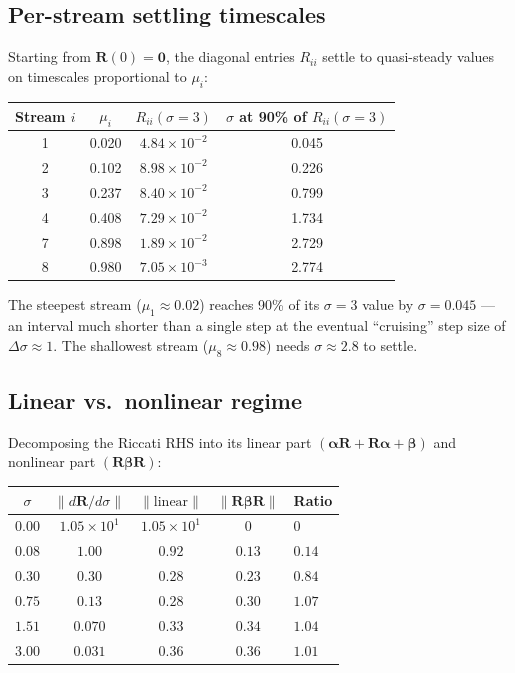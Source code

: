 \documentclass[11pt]{article}
\newcommand{\bR}{\mathbf{R}}
\newcommand{\balpha}{\boldsymbol{\alpha}}
\newcommand{\bbeta}{\boldsymbol{\beta}}
\newcommand{\norm}[1]{\lVert #1 \rVert}
\begin{document}
\subsection{Per-stream settling timescales}

Starting from $\bR(0)=\mathbf{0}$, the diagonal entries $R_{ii}$
settle to quasi-steady values on timescales proportional to $\mu_i$:

\begin{center}
\begin{tabular}{cccc}
\toprule
Stream $i$ & $\mu_i$ & $R_{ii}(\sigma=3)$ & $\sigma$ at 90\% of $R_{ii}(\sigma\!=\!3)$\\
\midrule
1 & 0.020 & $4.84\times10^{-2}$ & 0.045\\
2 & 0.102 & $8.98\times10^{-2}$ & 0.226\\
3 & 0.237 & $8.40\times10^{-2}$ & 0.799\\
4 & 0.408 & $7.29\times10^{-2}$ & 1.734\\
7 & 0.898 & $1.89\times10^{-2}$ & 2.729\\
8 & 0.980 & $7.05\times10^{-3}$ & 2.774\\
\bottomrule
\end{tabular}
\end{center}

The steepest stream ($\mu_1\approx0.02$) reaches 90\%
of its $\sigma=3$ value by $\sigma=0.045$ --- an interval much shorter
than a single step at the eventual ``cruising'' step size of
$\Delta\sigma\approx1$.  The shallowest stream
($\mu_8\approx0.98$) needs $\sigma\approx2.8$ to settle.

\subsection{Linear vs.\ nonlinear regime}

Decomposing the Riccati RHS into its linear part
$(\balpha\bR + \bR\balpha + \bbeta)$ and nonlinear part
$(\bR\bbeta\bR)$:

\begin{center}
\begin{tabular}{ccccl}
\toprule
$\sigma$ & $\norm{d\bR/d\sigma}$ & $\norm{\text{linear}}$ & $\norm{\bR\bbeta\bR}$ & Ratio\\
\midrule
$0.00$ & $1.05\times10^{1}$ & $1.05\times10^{1}$ & $0$ & $0$\\
$0.08$ & $1.00$ & $0.92$ & $0.13$ & $0.14$\\
$0.30$ & $0.30$ & $0.28$ & $0.23$ & $0.84$\\
$0.75$ & $0.13$ & $0.28$ & $0.30$ & $1.07$\\
$1.51$ & $0.070$ & $0.33$ & $0.34$ & $1.04$\\
$3.00$ & $0.031$ & $0.36$ & $0.36$ & $1.01$\\
\bottomrule
\end{tabular}
\end{center}
\end{document}
